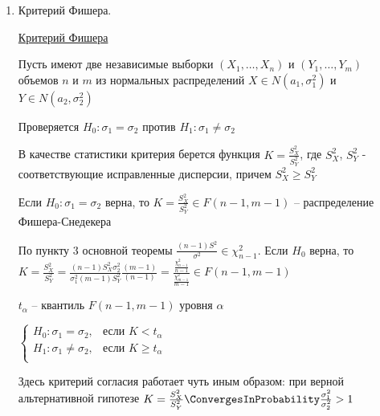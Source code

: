 \begin{enumerate}
    Критерий: $t_\alpha$ -- квантиль $\mathcal{K}$ уровня значимости $\alpha$

    $\begin{cases}
        H_0 : \mathcal{F} = \mathcal{J}, & \text{если } K < t_\alpha \\
        H_1 : \mathcal{F} \neq \mathcal{J}, & \text{если } K \geq t_\alpha \\
    \end{cases}$

    \item Критерий Фишера.

    \hyperlink{fishers_criterion}{Критерий Фишера}

    Пусть имеют две независимые выборки $(X_1, \dots, X_n)$ и $(Y_1, \dots, Y_m)$ объемов $n$ и $m$ из нормальных распределений $X \in N(a_1, \sigma^2_1)$ и $Y \in N(a_2, \sigma^2_2)$

    Проверяется $H_0 : \sigma_1 = \sigma_2$ против $H_1 : \sigma_1 \neq \sigma_2$

    В качестве статистики критерия берется функция $K = \frac{S_X^2}{S_Y^2}$, где $S_X^2$, $S_Y^2$ - соответствующие исправленные дисперсии, причем
    $S_X^2 \geq S_Y^2$

    \begin{MyTheorem}
        \Ths Если $H_0 : \sigma_1 = \sigma_2$ верна, то $K = \frac{S_X^2}{S_Y^2} \in F(n - 1, m - 1)$ -- распределение Фишера-Снедекера
    \end{MyTheorem}

    \begin{MyProof}
        По пункту 3 основной теоремы $\frac{(n - 1)S^2}{\sigma^2} \in \chi^2_{n - 1}$. Если $H_0$ верна, то $K = \frac{S_X^2}{S_Y^2} = \frac{(n - 1) S_X^2 \sigma_2^2}{\sigma_1^2 (m - 1) S_Y^2} \frac{(m - 1)}{(n - 1)} = \frac{\frac{\chi^2_{n - 1}}{n - 1}}{\frac{\chi^2_{m - 1}}{m - 1}} \in F(n - 1, m - 1)$
    \end{MyProof}

    $t_\alpha$ -- квантиль $F(n - 1, m - 1)$ уровня $\alpha$

    $\begin{cases}
        H_0 : \sigma_1 = \sigma_2, & \text{если } K < t_\alpha \\
        H_1 : \sigma_1 \neq \sigma_2, & \text{если } K \geq t_\alpha \\
    \end{cases}$

    \Nota Здесь критерий согласия работает чуть иным образом: при верной альтернативной гипотезе $K = \frac{S_X^2}{S_Y^2} \ConvergesInProbability \frac{\sigma_1^2}{\sigma_2^2} > 1$


\end{enumerate}
